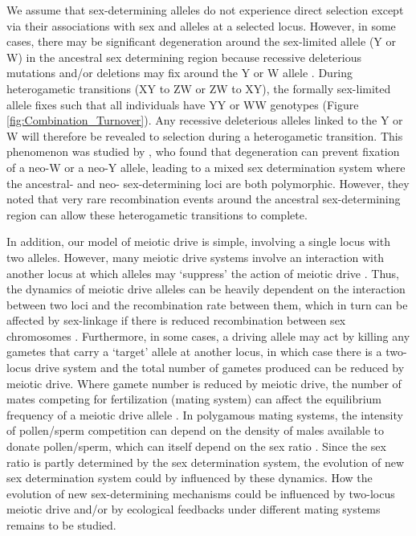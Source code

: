 \documentclass[12pt]{article}
\begin{document}
We assume that sex-determining alleles do not experience direct selection except via their associations with sex and alleles at a selected locus. 
However, in some cases, there may be significant degeneration around the sex-limited allele (Y or W) in the ancestral sex determining region because recessive deleterious mutations and/or deletions may fix around the Y or W allele \citep{Rice:1996ke,Charlesworth:2000cc,Bachtrog:2006ed,Marais:2008hm}. 
During heterogametic transitions (XY to ZW or ZW to XY), the formally sex-limited allele fixes such that all individuals have YY or WW genotypes (Figure \ref{fig:Combination_Turnover}). 
Any recessive deleterious alleles linked to the Y or W will therefore be revealed to selection during a heterogametic transition. 
This phenomenon was studied by \citet{vanDoorn:2010hu}, who found that degeneration can prevent fixation of a neo-W or a neo-Y allele, leading to a mixed sex determination system where the ancestral- and neo- sex-determining loci are both polymorphic. 
However, they noted that very rare recombination events around the ancestral sex-determining region can allow these heterogametic transitions to complete.  

In addition, our model of meiotic drive is simple, involving a single locus with two alleles. 
However, many meiotic drive systems involve an interaction with another locus at which alleles may `suppress' the action of meiotic drive \citep{Burt:2006,Lindholm:2016cw}.
Thus, the dynamics of meiotic drive alleles can be heavily dependent on the interaction between two loci and the recombination rate between them, which in turn can be affected by sex-linkage if there is reduced recombination between sex chromosomes \citep{Hurst:1991uh}.
Furthermore, in some cases, a driving allele may act by killing any gametes that carry a `target' allele at another locus, in which case there is a two-locus drive system and the total number of gametes produced can be reduced by meiotic drive. 
Where gamete number is reduced by meiotic drive, the number of mates competing for fertilization (mating system) can affect the equilibrium frequency of a meiotic drive allele \citep{Holman:2015en}. 
In polygamous mating systems, the intensity of pollen/sperm competition can depend on the density of males available to donate pollen/sperm, which can itself depend on the sex ratio \citep{Taylor:2002wu}. 
Since the sex ratio is partly determined by the sex determination system, the evolution of new sex determination system could by influenced by these dynamics. 
How the evolution of new sex-determining mechanisms could be influenced by two-locus meiotic drive and/or by ecological feedbacks under different mating systems remains to be studied.
\end{document}

